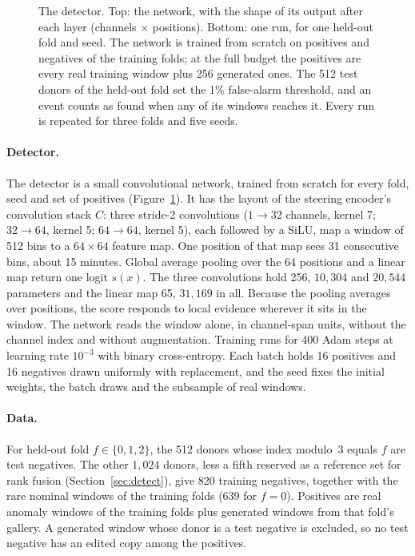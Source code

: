 \documentclass[11pt,a4paper]{article}
\begin{document}
\begin{figure}[t]
\caption{The detector. Top: the network, with the shape of its output after
each layer (channels $\times$ positions). Bottom: one run, for one held-out
fold and seed. The network is trained from scratch on positives and negatives
of the training folds; at the full budget the positives are every real
training window plus 256 generated ones. The 512 test donors of the held-out
fold set the 1\% false-alarm threshold, and an event counts as found when any
of its windows reaches it. Every run is repeated for three folds and five
seeds.}
\label{fig:detector}
\end{figure}

\paragraph{Detector.}
The detector is a small convolutional network, trained from scratch for every
fold, seed and set of positives (Figure~\ref{fig:detector}). It has the
layout of the steering encoder's convolution stack $C$: three stride-2
convolutions ($1 \to 32$ channels, kernel 7; $32 \to 64$, kernel 5;
$64 \to 64$, kernel 5), each followed by a SiLU, map a window of 512 bins to a
$64 \times 64$ feature map. One position of that map sees 31 consecutive
bins, about 15 minutes. Global average pooling over the 64 positions and a
linear map return one logit $s(x)$. The three convolutions hold 256,
$10{,}304$ and $20{,}544$ parameters and the linear map 65, $31{,}169$ in all.
Because the pooling averages over positions, the score responds to local
evidence wherever it sits in the window. The network reads the window alone,
in channel-span units, without the channel index and without augmentation.
Training runs for 400 Adam steps at learning rate $10^{-3}$ with binary
cross-entropy. Each batch holds 16 positives and 16 negatives drawn uniformly
with replacement, and the seed fixes the initial weights, the batch draws and
the subsample of real windows.

\paragraph{Data.}
For held-out fold $f \in \{0, 1, 2\}$, the 512 donors whose index modulo~3
equals $f$ are test negatives. The other $1{,}024$ donors, less a fifth
reserved as a reference set for rank fusion (Section~\ref{sec:detect}), give
820 training negatives, together with the rare nominal windows of the
training folds (639 for $f = 0$). Positives are real anomaly windows of the
training folds plus generated windows from that fold's gallery. A generated
window whose donor is a test negative is excluded, so no test negative has an
edited copy among the positives.
\end{document}
